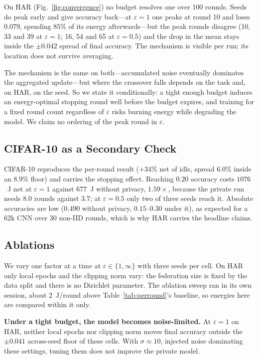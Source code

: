 On HAR (Fig.~\ref{fig:convergence}) no budget resolves one over 100 rounds.
Seeds do peak early and give accuracy back---at $\varepsilon = 1$ one peaks at
round 10 and loses $0.079$, spending $85\%$ of its energy afterwards---but the
peak rounds disagree (10, 33 and 39 at $\varepsilon = 1$; 16, 54 and 65 at
$\varepsilon = 0.5$) and the drop in the mean stays inside the $\pm 0.042$
spread of final accuracy. The mechanism is visible per run; its location does
not survive averaging.

The mechanism is the same on both---accumulated noise eventually dominates the
aggregated update---but where the crossover falls depends on the task and, on
HAR, on the seed. So we state it conditionally: a tight enough budget induces
an energy-optimal stopping round well before the budget expires, and training
for a fixed round count regardless of $\varepsilon$ risks burning energy while
degrading the model. We claim no ordering of the peak round in $\varepsilon$.

\subsection{CIFAR-10 as a Secondary Check}

CIFAR-10 reproduces the per-round result ($+34\%$ net of idle, spread $6.0\%$
inside an $8.9\%$ floor) and carries the stopping effect. Reaching $0.20$
accuracy costs $1076$~J net at $\varepsilon = 1$ against $677$~J without
privacy, $1.59\times$, because the private run needs $8.0$ rounds against
$3.7$; at $\varepsilon = 0.5$ only two of three seeds reach it. Absolute
accuracies are low ($0.490$ without privacy, $0.15$--$0.30$ under it), as
expected for a $62$k CNN over 30 non-IID rounds, which is why HAR carries the
headline claims.

\subsection{Ablations}

We vary one factor at a time at $\varepsilon \in \{1,\infty\}$ with three seeds per cell. On HAR only local epochs and the clipping norm vary: the federation size is fixed by the data split and there is no Dirichlet parameter. The ablation sweep ran in its own session, about $2$~J/round above Table~\ref{tab:perround}'s baseline, so energies here are compared within it only.

\textbf{Under a tight budget, the model becomes noise-limited.} At $\varepsilon=1$ on HAR, neither local epochs nor clipping norm moves final accuracy outside the $\pm 0.041$ across-seed floor of these cells. With $\sigma\approx10$, injected noise dominating these settings, tuning them does not improve the private model.

